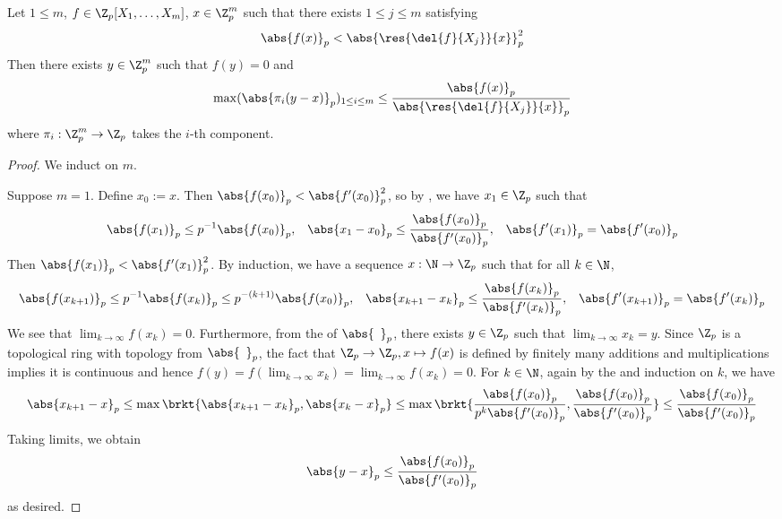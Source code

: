 \begin{prop}
  
  Let $1 \leq m$, $f \in \Z_p[X_1,\dots,X_m]$, $x \in \Z_p^m$ such that 
  there exists $1 \leq j \leq m$ satisfying 
  \[
    \abs{f(x)}_p < \abs{\res{\del{f}{X_j}}{x}}_p^2
  \]
  Then there exists $y \in \Z_p^m$ such that 
  $f(y) = 0$ and 
  \[
    \max(\abs{\pi_i(y - x)}_p)_{1\leq i \leq m} 
    \leq \frac{\abs{f(x)}_p}{\abs{\res{\del{f}{X_j}}{x}}_p}
  \]
  where $\pi_i : \Z_p^m \to \Z_p$ takes the $i$-th component.
\end{prop}
\begin{proof}
  We induct on $m$. 

  Suppose $m = 1$. Define $x_0 := x$. 
  Then $\abs{f(x_0)}_p < \abs{f'(x_0)}_p^2$, 
  so by , 
  we have $x_1 \in \Z_p$ such that 
  \begin{align*}
    \abs{f(x_1)}_p \leq p^{-1}\abs{f(x_0)}_p , &&
    \abs{x_1 - x_0}_p 
    \leq \frac{\abs{f(x_0)}_p}{\abs{f'(x_0)}_p} , &&
    \abs{f'(x_1)}_p = \abs{f'(x_0)}_p 
  \end{align*}
  Then $\abs{f(x_1)}_p < \abs{f'(x_1)}_p^2$. 
  By induction, we have a sequence $x : \N \to \Z_p$ such that 
  for all $k \in \N$, 
  \begin{align*}
    \abs{f(x_{k+1})}_p \leq p^{-1}\abs{f(x_k)}_p 
    \leq p^{-(k+1)} \abs{f(x_0)}_p ,  &&
    \abs{x_{k+1} - x_k}_p 
    \leq \frac{\abs{f(x_k)}_p}{\abs{f'(x_k)}_p} , && 
    \abs{f'(x_{k+1})}_p = \abs{f'(x_k)}_p
  \end{align*}
  We see that 
  $\lim_{k\to\infty} f(x_k) = 0$. 
  Furthermore, from the  
  of $\abs{\hspace{5pt}}_p$, 
  there exists $y \in \Z_p$ such that $\lim_{k\to\infty} x_k = y$. 
  Since $\Z_p$ is a topological ring with topology from 
  $\abs{\hspace{5pt}}_p$, 
  the fact that $\Z_p \to \Z_p, x \mapsto f(x)$ is defined by finitely many 
  additions and multiplications implies
  it is continuous and hence
  $f(y) = f(\lim_{k\to\infty} x_k) = \lim_{k\to\infty} f(x_k) = 0$.
  For $k \in \N$, again by 
  the  and 
  induction on $k$,
  we have
  \[
    \abs{x_{k+1} - x}_p 
    \leq \max\brkt{\abs{x_{k+1} - x_k}_p, \abs{x_k - x}_p}
    \leq \max\brkt{\frac{\abs{f(x_0)}_p}{p^k \abs{f'(x_0)}_p},
    \frac{\abs{f(x_0)}_p}{\abs{f'(x_0)}_p}
    }
    \leq \frac{\abs{f(x_0)}_p}{\abs{f'(x_0)}_p}
  \]
  Taking limits, we obtain \[
    \abs{y - x}_p \leq \frac{\abs{f(x_0)}_p}{\abs{f'(x_0)}_p}
  \]
  as desired. 


\end{proof}
